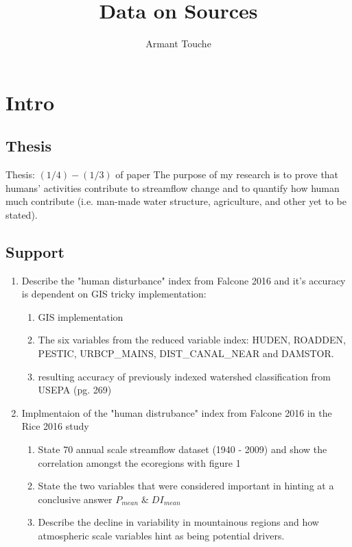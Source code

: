 \documentclass{article}
\begin{document}
\title{\vspace{-2cm}Data on Sources}
\author{Armant Touche}
\maketitle

\section{Intro}

    \subsection{Thesis} Thesis: $(1/4) - (1/3)$ of paper The purpose of my research is to prove that humans' activities contribute to streamflow change and to quantify how human much contribute (i.e. man-made water structure, agriculture, and other yet to be stated).

    \subsection{Support}
    \begin{enumerate}
        \item Describe the "human disturbance" index from Falcone 2016 and it's accuracy is dependent on GIS tricky implementation:
            \begin{enumerate}
                \item GIS implementation
                \item The six variables from the reduced variable index: HUDEN, ROADDEN, PESTIC, URBCP\_MAINS, DIST\_CANAL\_NEAR and DAMSTOR. 
                \item resulting accuracy of previously indexed watershed classification from USEPA (pg. 269)
            \end{enumerate}

        \item Implmentaion of the "human distrubance" index from Falcone 2016 in the Rice 2016 study
            \begin{enumerate}
                \item State 70 annual scale streamflow dataset (1940 - 2009) and show the correlation amongst the ecoregions with figure 1
                \item State the two variables that were considered important in hinting at a conclusive answer $P_\textit{mean} \;\&\; {DI}_\textit{mean}$ 
                \item Describe the decline in variability in mountainous regions and how atmospheric scale variables hint as being potential drivers. 
            \end{enumerate}

    \end{enumerate}
\end{document}
